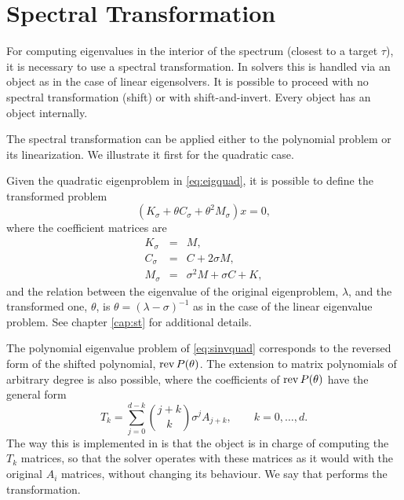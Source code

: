 \section{\label{sec:qst}Spectral Transformation}

For computing eigenvalues in the interior of the spectrum (closest to a target $\tau$), it is necessary to use a spectral transformation. In  solvers this is handled via an  object as in the case of linear eigensolvers. It is possible to proceed with no spectral transformation (shift) or with shift-and-invert. Every  object has an  object internally.

The spectral transformation can be applied either to the polynomial problem or its linearization. We illustrate it first for the quadratic case.

Given the quadratic eigenproblem in \eqref{eq:eigquad}, it is possible to define the transformed problem
\begin{equation}
\label{eq:sinvquad}
(K_\sigma+\theta C_\sigma+\theta^2M_\sigma)x=0,
\end{equation}
where the coefficient matrices are
\begin{eqnarray}
K_\sigma&\!\!=\!\!&M,\\
C_\sigma&\!\!=\!\!&C+2\sigma M,\\
M_\sigma&\!\!=\!\!&\sigma^2 M+\sigma C+K,
\end{eqnarray}
and the relation between the eigenvalue of the original eigenproblem, $\lambda$, and the transformed one, $\theta$, is $\theta=(\lambda-\sigma)^{-1}$ as in the case of the linear eigenvalue problem. See chapter \ref{cap:st} for additional details.

The polynomial eigenvalue problem of \eqref{eq:sinvquad} corresponds to the reversed form of the shifted polynomial, $\operatorname{rev} P(\theta)$. The extension to matrix polynomials of arbitrary degree is also possible, where the coefficients of $\operatorname{rev} P(\theta)$ have the general form
\begin{equation}
\label{eq:sinvpep}
T_k=\sum_{j=0}^{d-k}\binom{j+k}{k}\sigma^{j}A_{j+k},\qquad k=0,\ldots,d.
\end{equation}
The way this is implemented in \slepc is that the  object is in charge of computing the $T_k$ matrices, so that the  solver operates with these matrices as it would with the original $A_i$ matrices, without changing its behaviour. We say that  performs the transformation.

